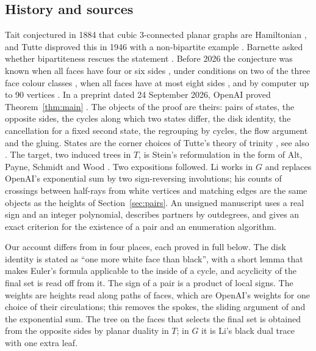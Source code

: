 \documentclass[10pt]{amsart}
\numberwithin{equation}{section}
\theoremstyle{definition}
\theoremstyle{remark}
\newcommand{\T}{T}
\begin{document}
\subsection*{History and sources}
Tait conjectured in 1884 that cubic $3$-connected planar graphs are Hamiltonian \cite{tait1884}, and Tutte disproved this in 1946 with a non-bipartite example \cite{tutte1946}.
Barnette asked whether bipartiteness rescues the statement \cite{barnette1969}.
Before 2026 the conjecture was known when all faces have four or six sides \cite{goodey1975}, under conditions on two of the three face colour classes \cite{feder-subi2006}, when all faces have at most eight sides \cite{schnieders2025}, and by computer up to 90 vertices \cite{hmm1985,bgm2021}.
In a preprint dated 24 September 2026, OpenAI proved Theorem~\ref{thm:main} \cite{openai2026}.
The objects of the proof are theirs: pairs of states, the opposite sides, the cycles along which two states differ, the disk identity, the cancellation for a fixed second state, the regrouping by cycles, the flow argument and the gluing.
States are the corner choices of Tutte's theory of trinity \cite{tutte1975}, see also \cite{hine-kalman2018}.
The target, two induced trees in $\T$, is Stein's reformulation \cite{stein1971} in the form of Alt, Payne, Schmidt and Wood \cite[Lemma~5]{apsw2016}.
Two expositions followed.
Li \cite{li2026} works in $G$ and replaces OpenAI's exponential sum by two sign-reversing involutions; his counts of crossings between half-rays from white vertices and matching edges are the same objects as the heights of Section~\ref{sec:pairs}.
An unsigned manuscript \cite{constructive2026} uses a real sign and an integer polynomial, describes partners by outdegrees, and gives an exact criterion for the existence of a pair and an enumeration algorithm.

Our account differs from \cite{openai2026} in four places, each proved in full below.
The disk identity is stated as ``one more white face than black'', with a short lemma that makes Euler's formula applicable to the inside of a cycle, and acyclicity of the final set is read off from it.
The sign of a pair is a product of local signs.
The weights are heights read along paths of faces, which are OpenAI's weights for one choice of their circulations; this removes the spokes, the sliding argument of \cite[Section~5.3]{openai2026} and the exponential sum.
The tree on the faces that selects the final set is obtained from the opposite sides by planar duality in $\T$; in $G$ it is Li's black dual trace \cite[Section~6]{li2026} with one extra leaf.
\end{document}
